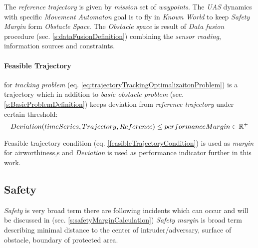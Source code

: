 The \emph{reference trajectory} is given by \emph{mission} set of \emph{waypoints}. The \emph{UAS} dynamics with specific \emph{Movement Automaton} goal is to fly in \emph{Known World} to keep \emph{Safety Margin} form  \emph{Obstacle Space}. The \emph{Obstacle space} is result of \emph{Data fusion} procedure (sec. \ref{s:dataFusionDefinition}) combining the \emph{sensor reading}, information sources and constraints.

\paragraph{Feasible Trajectory} for \emph{tracking problem} (eq. \ref{eq:trajectoryTrackingOptimalizaitonProblem}) is a trajectory which in addition to \emph{basic obstacle problem} (sec. \ref{s:BasicProblemDefinition}) keeps deviation from \emph{reference trajectory} under certain threshold:
\begin{equation}\label{feasibleTrajectoryCondition}
    Deviation(timeSeries, Trajectory, Reference) \le performanceMargin \in \mathbb{R}^+
\end{equation}

Feasible trajectory condition (eq. \ref{feasibleTrajectoryCondition}) is used as \emph{margin} for airworthiness,s and \emph{Deviation} is used as performance indicator further in this work.


\subsection{Safety}\label{s:Safety}
\noindent \emph{Safety} is very broad term there are following incidents which can occur and will be discussed in (sec. \ref{s:safetyMarginCalculation}) \emph{Safety margin} is broad term describing minimal distance to the center of intruder/adversary, surface of obstacle, boundary of protected area.

